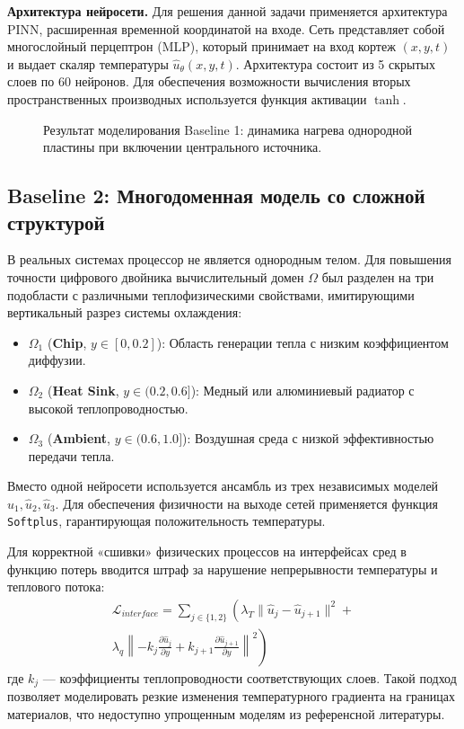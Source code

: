 \documentclass[conference]{IEEEtran}
\begin{document}
\textbf{Архитектура нейросети.} Для решения данной задачи применяется архитектура PINN, расширенная временной координатой на входе. Сеть представляет собой многослойный перцептрон (MLP), который принимает на вход кортеж $(x, y, t)$ и выдает скаляр температуры $\hat{u}_\theta(x, y, t)$. Архитектура состоит из 5 скрытых слоев по 60 нейронов. Для обеспечения возможности вычисления вторых пространственных производных используется функция активации $\tanh$.

\begin{figure}[ht!]
    \centering
    \caption{Результат моделирования Baseline 1: динамика нагрева однородной пластины при включении центрального источника.}
    \label{fig:baseline1_res}
\end{figure}

\subsection{Baseline 2: Многодоменная модель со сложной структурой}

В реальных системах процессор не является однородным телом. Для повышения точности цифрового двойника вычислительный домен $\Omega$ был разделен на три подобласти с различными теплофизическими свойствами, имитирующими вертикальный разрез системы охлаждения:
\begin{itemize}
    \item $\Omega_1$ (\textbf{Chip}, $y \in [0, 0.2]$): Область генерации тепла с низким коэффициентом диффузии.
    \item $\Omega_2$ (\textbf{Heat Sink}, $y \in (0.2, 0.6]$): Медный или алюминиевый радиатор с высокой теплопроводностью.
    \item $\Omega_3$ (\textbf{Ambient}, $y \in (0.6, 1.0]$): Воздушная среда с низкой эффективностью передачи тепла.
\end{itemize}

Вместо одной нейросети используется ансамбль из трех независимых моделей $\hat{u}_1, \hat{u}_2, \hat{u}_3$. Для обеспечения физичности на выходе сетей применяется функция \texttt{Softplus}, гарантирующая положительность температуры.

Для корректной «сшивки» физических процессов на интерфейсах сред в функцию потерь вводится штраф за нарушение непрерывности температуры и теплового потока:
\begin{equation}
\begin{aligned}
    \mathcal{L}_{interface} = \sum_{j \in \{1,2\}} \left( \lambda_T \| \hat{u}_j - \hat{u}_{j+1} \|^2 + \right. \\
    \left. \lambda_q \left\| -k_j \frac{\partial \hat{u}_j}{\partial y} + k_{j+1} \frac{\partial \hat{u}_{j+1}}{\partial y} \right\|^2 \right)
\end{aligned}
\end{equation}
где $k_j$ — коэффициенты теплопроводности соответствующих слоев. Такой подход позволяет моделировать резкие изменения температурного градиента на границах материалов, что недоступно упрощенным моделям из референсной литературы.
\end{document}
